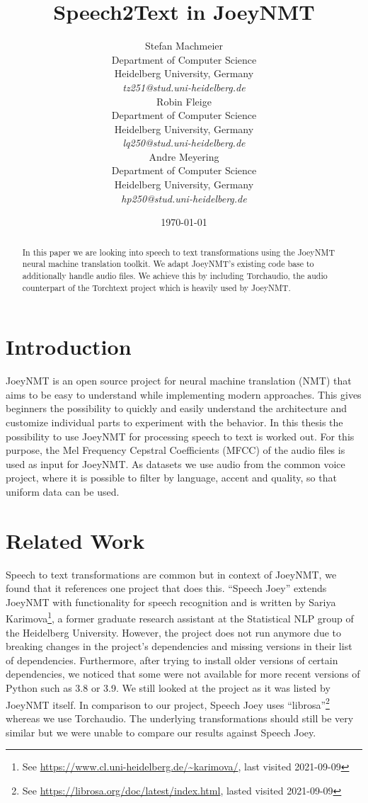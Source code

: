 \documentclass[11pt,a4paper]{article}
\title{Speech2Text in JoeyNMT}
\author{\small Stefan Machmeier \\
  \small Department of Computer Science \\
  \small Heidelberg University, Germany \\
  \small \textit{tz251@stud.uni-heidelberg.de} \\
  \And
  \small Robin Fleige \\
  \small Department of Computer Science \\
  \small Heidelberg University, Germany \\
  \small \textit{lq250@stud.uni-heidelberg.de} \\
  \And
  \small Andre Meyering \\
  \small Department of Computer Science \\
  \small Heidelberg University, Germany \\
  \small \textit{hp250@stud.uni-heidelberg.de} \\}
\date{\today}
\begin{document}
\maketitle
\begin{abstract}
In this paper we are looking into speech to text transformations using the JoeyNMT neural machine translation toolkit.
We adapt JoeyNMT's existing code base to additionally handle audio files.
We achieve this by including Torchaudio, the audio counterpart of the Torchtext project which is heavily used by JoeyNMT.
\end{abstract}

\section{Introduction}

JoeyNMT is an open source project for neural machine
translation (NMT) that aims to be easy to understand while implementing modern approaches. This gives beginners the possibility to quickly and easily understand the architecture and customize individual parts to experiment with the behavior.
In this thesis the possibility to use JoeyNMT for processing speech to text is worked out. For this purpose, the Mel Frequency Cepstral Coefficients (MFCC) of the audio files is used as input for JoeyNMT. As datasets we use audio from the common voice project, where it is possible to filter by language, accent and quality, so that uniform data can be used.

\section{Related Work}

Speech to text transformations are common but in context of JoeyNMT, we found that it references one project that does this.
\enquote{Speech Joey}\cite{speech_joey} extends JoeyNMT with functionality for speech recognition and is written by Sariya Karimova\footnote{See \url{https://www.cl.uni-heidelberg.de/~karimova/}, last visited 2021-09-09}, a former graduate research assistant at the Statistical NLP group of the Heidelberg University.
However, the project does not run anymore due to breaking changes in the project's
dependencies and missing versions in their list of dependencies.
Furthermore, after trying to install older versions of certain dependencies,
we noticed that some were not available for more recent versions of Python such as 3.8 or 3.9.
We still looked at the project as it was listed by JoeyNMT itself.
In comparison to our project, Speech Joey uses \enquote{librosa}\footnote{See \url{https://librosa.org/doc/latest/index.html}, lasted visited 2021-09-09} whereas we use Torchaudio.
The underlying transformations should still be very similar but we were unable to compare our results against Speech Joey.
\end{document}
